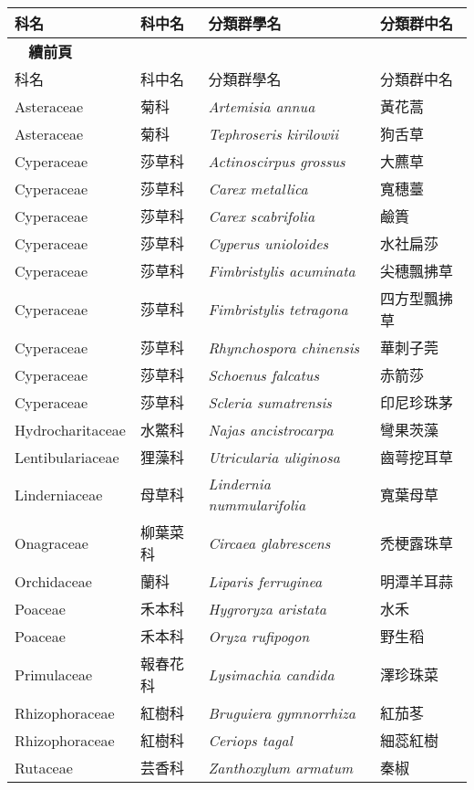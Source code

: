     \begin{longtable}{p{3cm}p{2cm}p{5cm}p{3cm}}
    \toprule
      科名 & 科中名 & 分類群學名 & 分類群中名  \\
    \midrule 
    \endfirsthead
    
    {{\bfseries \tablename\ \thetable{} 續前頁 }} \\
    科名 & 科中名 & 分類群學名 & 分類群中名  \\
    \midrule
    \endhead
            Asteraceae & 菊科 & \textit{Artemisia annua}  & 黃花蒿\\
    Asteraceae & 菊科 & \textit{Tephroseris kirilowii}  & 狗舌草\\
    Cyperaceae & 莎草科 & \textit{Actinoscirpus grossus}  & 大藨草\\
    Cyperaceae & 莎草科 & \textit{Carex metallica}  & 寬穗薹\\
    Cyperaceae & 莎草科 & \textit{Carex scabrifolia}  & 鹼簣\\
    Cyperaceae & 莎草科 & \textit{Cyperus unioloides}  & 水社扁莎\\
    Cyperaceae & 莎草科 & \textit{Fimbristylis acuminata}  & 尖穗飄拂草\\
    Cyperaceae & 莎草科 & \textit{Fimbristylis tetragona}  & 四方型飄拂草\\
    Cyperaceae & 莎草科 & \textit{Rhynchospora chinensis}  & 華刺子莞\\
    Cyperaceae & 莎草科 & \textit{Schoenus falcatus}  & 赤箭莎\\
    Cyperaceae & 莎草科 & \textit{Scleria sumatrensis}  & 印尼珍珠茅\\
    Hydrocharitaceae & 水鱉科 & \textit{Najas ancistrocarpa}  & 彎果茨藻\\
    Lentibulariaceae & 狸藻科 & \textit{Utricularia uliginosa}  & 齒萼挖耳草\\
    Linderniaceae & 母草科 & \textit{Lindernia nummularifolia}  & 寬葉母草\\
    Onagraceae & 柳葉菜科 & \textit{Circaea glabrescens}  & 禿梗露珠草\\
    Orchidaceae & 蘭科 & \textit{Liparis ferruginea}  & 明潭羊耳蒜\\
    Poaceae & 禾本科 & \textit{Hygroryza aristata}  & 水禾\\
    Poaceae & 禾本科 & \textit{Oryza rufipogon}  & 野生稻\\
    Primulaceae & 報春花科 & \textit{Lysimachia candida}  & 澤珍珠菜\\
    Rhizophoraceae & 紅樹科 & \textit{Bruguiera gymnorrhiza}  & 紅茄苳\\
    Rhizophoraceae & 紅樹科 & \textit{Ceriops tagal}  & 細蕊紅樹\\
    Rutaceae & 芸香科 & \textit{Zanthoxylum armatum}  & 秦椒\\
    \bottomrule
    \end{longtable}
